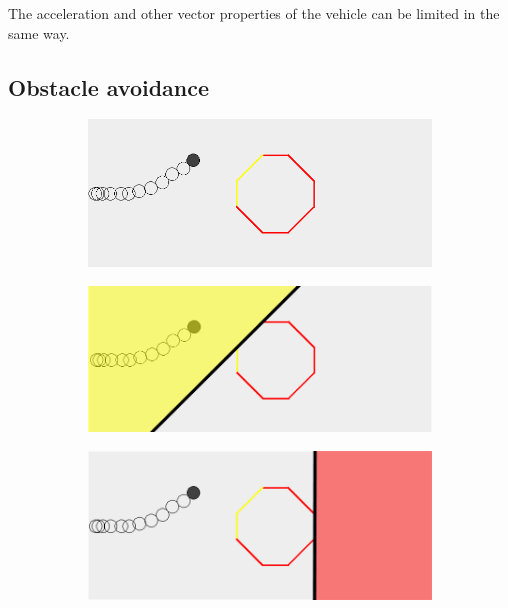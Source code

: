 The acceleration and other vector properties of the vehicle can be limited in the same way. 
\subsection{Obstacle avoidance}

\begin{figure}[!t]
    \centering
    
    \begin{subfigure}[t]{0.47\textwidth}
        \includegraphics[width=\textwidth]{img/obs1}
        \caption{}
    \end{subfigure}
    \hfil
    \begin{subfigure}[t]{0.47\textwidth}
        \includegraphics[width=\textwidth]{img/obs2}
        \caption{}
    \end{subfigure}
    \par\bigskip
    \begin{subfigure}[t]{0.47\textwidth}
        \includegraphics[width=\textwidth]{img/obs3}

\end{subfigure}
\end{figure}
